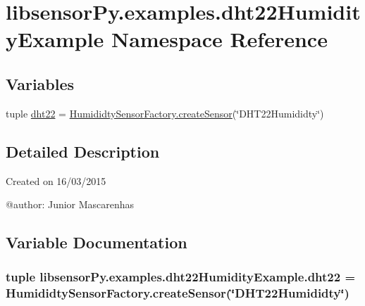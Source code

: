 \hypertarget{namespacelibsensorPy_1_1examples_1_1dht22HumidityExample}{}\section{libsensor\+Py.\+examples.\+dht22\+Humidity\+Example Namespace Reference}
\label{namespacelibsensorPy_1_1examples_1_1dht22HumidityExample}
\subsection*{Variables}
\begin{DoxyCompactItemize}
\item 
tuple \hyperlink{namespacelibsensorPy_1_1examples_1_1dht22HumidityExample_a818c8df6954230b99c6bbbf04ac78586}{dht22} = \hyperlink{classconcretefactory_1_1humiditySensorFactory_1_1HumididtySensorFactory_a591e773357247fd00a760fa160d7b231}{Humididty\+Sensor\+Factory.\+create\+Sensor}(\char`\"{}D\+H\+T22\+Humididty\char`\"{})
\end{DoxyCompactItemize}


\subsection{Detailed Description}
\begin{DoxyVerb}Created on 16/03/2015

@author: Junior Mascarenhas
\end{DoxyVerb}
 

\subsection{Variable Documentation}
\hypertarget{namespacelibsensorPy_1_1examples_1_1dht22HumidityExample_a818c8df6954230b99c6bbbf04ac78586}{}
\subsubsection[{dht22}]{\setlength{\rightskip}{0pt plus 5cm}tuple libsensor\+Py.\+examples.\+dht22\+Humidity\+Example.\+dht22 = {\bf Humididty\+Sensor\+Factory.\+create\+Sensor}(\char`\"{}D\+H\+T22\+Humididty\char`\"{})}\label{namespacelibsensorPy_1_1examples_1_1dht22HumidityExample_a818c8df6954230b99c6bbbf04ac78586}

